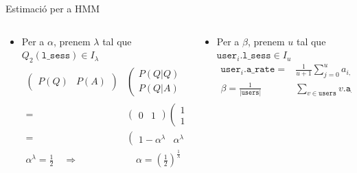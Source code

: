 \documentclass[xcolor=x11names,
								compress,
								aspectratio=1610]{beamer}
\newcommand{\mt}[1]{\texttt{#1}}
\theoremstyle{definition}%
\renewcommand{\(}{\begin{columns}}
\renewcommand{\)}{\end{columns}}
\newcommand{\<}[1]{\begin{column}{#1}}
\renewcommand{\>}{\end{column}}
\begin{document}
\begin{frame}{Estimació per a HMM}
	\begin{columns}[onlytextwidth]
		\begin{column}{.5\textwidth}
			\begin{itemize}
			\item Per a $\alpha$, prenem $\lambda$ tal que $ Q_2(\mt{l\_sess}) \in I_\lambda$
			\begin{align*}
      \begin{pmatrix}
      P(Q) & P(A)
      \end{pmatrix}
      &
      \begin{pmatrix}
      P(Q|Q) & P(A|Q) \\
      P(Q|A) & P(A|A)
      \end{pmatrix}^\lambda
      \\
      = &
      \begin{pmatrix}
      0 & 1
      \end{pmatrix}
      \begin{pmatrix}
      1 & 0 \\
      1 - \alpha & \alpha
      \end{pmatrix}^\lambda
      \\
      = &
      \begin{pmatrix}
      1-\alpha^\lambda & \alpha^\lambda
      \end{pmatrix} \\
      \alpha^{\lambda} = \frac{1}{2} \quad \Rightarrow & \quad \alpha = \left(\frac{1}{2}\right)^{\frac{1}{\lambda}} \\
      \end{align*} 
			\end{itemize}
		\end{column}
		\begin{column}{.5\textwidth}
		\begin{itemize}
		\item Per a $\beta$, prenem $u$ tal que $\mt{user}_i.\mt{l\_sess} \in I_u$
		\begin{align*}
			\mt{user}_i.\mt{a\_rate} = & \frac{1}{u+1} \sum_{j = 0}^u a_{i,j} \\
			\beta = \frac{1}{|\mt{users}|} & \sum_{v \in \mt{users}} v.\mt{a\_rate}
		\end{align*}
		\vspace{1.9cm}
		\end{itemize}
		\end{column}
	\end{columns}
\end{frame}
\end{document}

